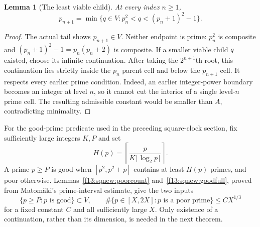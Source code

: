 \documentclass[11pt,a4paper]{article}
\newtheorem{lemma}[theorem]{Lemma}
\theoremstyle{definition}
\theoremstyle{remark}
\numberwithin{equation}{section}
\begin{document}
\begin{lemma}[The least viable child]
\label{ft:lem:viable-child}
At every index $n\ge1$,
\[
 p_{n+1}=
 \min\{q\in V:p_n^2<q<(p_n+1)^2-1\}.
\]
\end{lemma}
\begin{proof}
The actual tail shows $p_{n+1}\in V$. Neither endpoint is prime:
$p_n^2$ is composite and $(p_n+1)^2-1=p_n(p_n+2)$ is composite.
If a smaller viable child $q$ existed, choose its infinite continuation.
After taking the $2^{n+1}$th root, this continuation lies strictly inside
the $p_n$ parent cell and below the $p_{n+1}$ cell. It respects every
earlier prime condition. Indeed, an earlier integer-power boundary
becomes an integer at level $n$, so it cannot cut the interior of a
single level-$n$ prime cell. The resulting admissible constant would
be smaller than $A$, contradicting minimality.
\end{proof}

For the good-prime predicate used in the preceding square-clock section,
fix sufficiently large integers $K,P$ and set
\[
 H(p)=\left\lceil\frac{p}{K\lceil\log_2p\rceil}\right\rceil.
\]
A prime $p\ge P$ is good when $[p^2,p^2+p]$ contains at least $H(p)$
primes, and poor otherwise. Lemmas~\ref{f13:sqnew:poorcount}
and~\ref{f13:sqnew:goodfull}, proved from Matom\"aki's prime-interval
estimate, give the two inputs
\begin{equation}
\label{ft:eq:good-poor-inputs}
 \{p\ge P:p\text{ is good}\}\subset V,
 \qquad
 \#\{p\in[X,2X]:p\text{ is a poor prime}\}\le C X^{1/3}
\end{equation}
for a fixed constant $C$ and all sufficiently large $X$.
Only existence of a continuation, rather than its dimension, is needed
in the next theorem.
\end{document}
